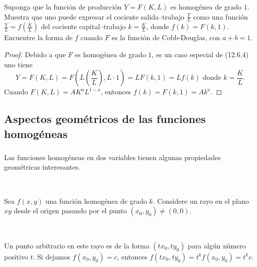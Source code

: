 \begin{frame}[t]
\frametitle{\secname}
\begin{example}
Suponga que la función de producción $Y=F\left(K,L\right)$ es homogénea de grado $1$. Muestra que uno puede expresar el cociente salida--trabajo $\frac{Y}{L}$ como una función $\frac{Y}{L}=f\left(\frac{K}{L}\right)$ del cociente capital--trabajo $k=\frac{K}{L}$, donde $f\left(k\right)=F\left(k,1\right)$. Encuentre la forma de $f$ cuando $F$ es la función de Cobb-Douglas, con $a+b=1$.
\end{example}

\begin{proof}
Debido a que $F$ es homogénea de grado $1$, es un caso especial de (12.6.4) uno tiene \[ Y=F\left(K,L\right)=F\left(L\left(\frac{K}{L}\right),L\cdot1\right)=LF\left(k,1\right)=Lf\left(k\right) \text{ donde }k=\frac{K}{L}. \] Cuando $F\left(K,L\right)=AK^{a}L^{1-a}$, entonces $f\left(k\right)=F\left(k,1\right)=Ak^{a}$.
\end{proof}

\end{frame}

\subsection{Aspectos geométricos de las funciones homogéneas}

\begin{frame}[t]
\frametitle{\subsecname}
Las funciones homogéneas en dos variables tienen algunas propiedades geométricas interesantes.

\

Sea $f\left(x,y\right)$ una función homogénea de grado $k$. Considere un rayo en el plano $xy$ desde el origen pasando por el punto $\left(x_{0},y_{0}\right)\neq\left(0,0\right)$.

\

Un punto arbitrario en este rayo es de la forma $\left(tx_{0},ty_{0}\right)$ para algún número positivo $t$. Si dejamos $f\left(x_{0},y_{0}\right)=c$, entonces $f\left(tx_{0},ty_{0}\right)=t^{k}f\left(x_{0},y_{0}\right)=t^{k}c$. 
\end{frame}

